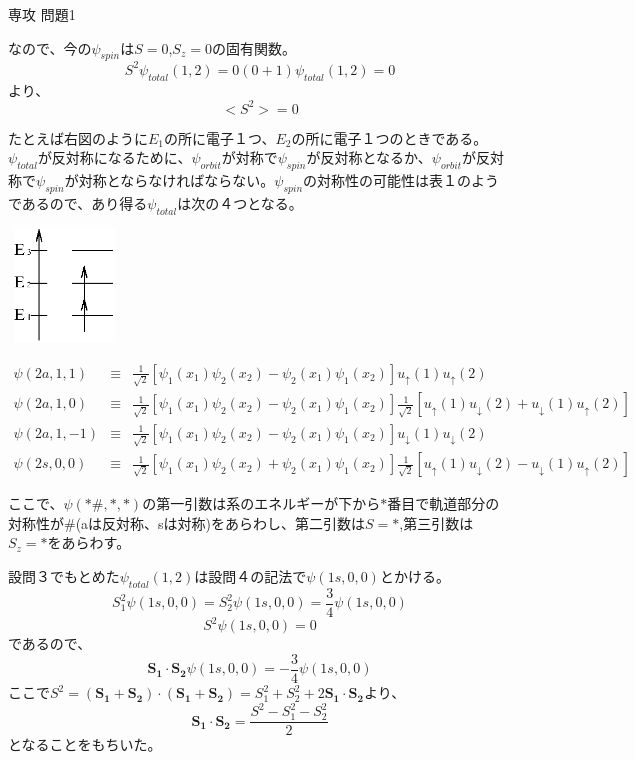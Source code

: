 \documentclass[fleqn]{jbook}
\begin{document}
\begin{answer}{専攻 問題1}{}
\begin{subanswers}
なので、今の$\psi_{spin}$は$S=0$,$S_{z}=0$の固有関数。
\[
S^{2}\psi_{total}(1,2)=0(0+1)\psi_{total}(1,2)=0
\]
より、
\[
<S^{2}>=0
\]

\SubAnswer


\parbox[t]{90mm}{
たとえば右図のように$E_{1}$の所に電子１つ、$E_{2}$の所に電子１つのときである。$\psi_{total}$が反対称になるために、$\psi_{orbit}$が対称で$\psi_{spin}$が反対称となるか、$\psi_{orbit}$が反対称で$\psi_{spin}$が対称とならなければならない。$\psi_{spin}$の対称性の可能性は表１のようであるので、あり得る$\psi_{total}$は次の４つとなる。}
\parbox[t]{60mm}{
\begin{center}
\includegraphics[clip,height=30mm,width=30mm]{1998phy1-2.eps}
\end{center}
}


\begin{eqnarray*}
\psi(2a,1,1) &\equiv& \frac{1}{\sqrt{2}}[\psi_{1}(x_{1})\psi_{2}(x_{2})-\psi_{2}(x_{1})\psi_{1}(x_{2})]u_{\uparrow}(1)u_{\uparrow}(2) \\
\psi(2a,1,0) &\equiv& \frac{1}{\sqrt{2}}[\psi_{1}(x_{1})\psi_{2}(x_{2})-\psi_{2}(x_{1})\psi_{1}(x_{2})]\frac{1}{\sqrt{2}}[u_{\uparrow}(1)u_{\downarrow}(2)+u_{\downarrow}(1)u_{\uparrow}(2)] \\
\psi(2a,1,-1) &\equiv& \frac{1}{\sqrt{2}}[\psi_{1}(x_{1})\psi_{2}(x_{2})-\psi_{2}(x_{1})\psi_{1}(x_{2})]u_{\downarrow}(1)u_{\downarrow}(2) \\
\psi(2s,0,0) &\equiv& \frac{1}{\sqrt{2}}[\psi_{1}(x_{1})\psi_{2}(x_{2})+\psi_{2}(x_{1})\psi_{1}(x_{2})]\frac{1}{\sqrt{2}}[u_{\uparrow}(1)u_{\downarrow}(2)-u_{\downarrow}(1)u_{\uparrow}(2)]
\end{eqnarray*}

ここで、$\psi(*\#,*,*)$の第一引数は系のエネルギーが下から$*$番目で軌道部分の対称性が\#(aは反対称、sは対称)をあらわし、第二引数は$S=*$,第三引数は$S_{z}=*$をあらわす。

\SubAnswer

設問３でもとめた$\psi_{total}(1,2)$は設問４の記法で$\psi(1s,0,0)$とかける。
\[
S_{1}^{2}\psi(1s,0,0)=S_{2}^{2}\psi(1s,0,0)=\frac{3}{4}\psi(1s,0,0)
\]
\[
S^{2}\psi(1s,0,0)=0
\]
であるので、
\begin{equation}
\mathbf{S_{1}{\cdot}S_{2}}\psi(1s,0,0)=-\frac{3}{4}\psi(1s,0,0)
\end{equation}
ここで$S^{2}=\mathbf{(S_{1}+S_{2})\cdot(S_{1}+S_{2})}=S_{1}^{2}+S_{2}^{2}+2\mathbf{S_{1}{\cdot}S_{2}}$より、
\[
\mathbf{S_{1}{\cdot}S_{2}}=\frac{S^{2}-S_{1}^{2}-S_{2}^{2}}{2}
\]
となることをもちいた。


\end{subanswers}
\end{answer}
\end{document}
